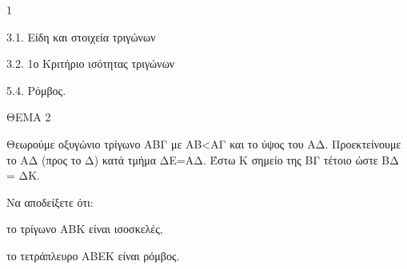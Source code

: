 \begin{ylh}{1}
    \item 3.1. Είδη και στοιχεία τριγώνων
    \item 3.2. 1ο Κριτήριο ισότητας τριγώνων
    \item 5.4. Ρόμβος.
\end{ylh}

ΘΕΜΑ 2

Θεωρούμε οξυγώνιο τρίγωνο ΑΒΓ με ΑΒ\textless ΑΓ και το ύψος του ΑΔ. Προεκτείνουμε το ΑΔ (προς το Δ) κατά τμήμα ΔΕ=ΑΔ. Έστω Κ σημείο της ΒΓ τέτοιο ώστε ΒΔ = ΔΚ.

Να αποδείξετε ότι:

\begin{alist}
\item το τρίγωνο ΑΒΚ είναι ισοσκελές, 

\item το τετράπλευρο ΑΒΕΚ είναι ρόμβος. 
\end{alist}
